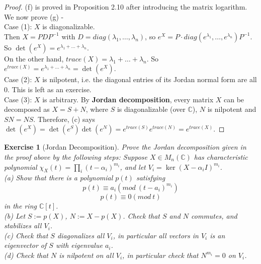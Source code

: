 \documentclass[11pt]{article}
\newtheorem{exercise}[theorem]{Exercise}
\newcommand{\bb}[1]{\mathbb{#1}}
\begin{document}
\begin{proof}
(f) is proved in Proposition 2.10 after introducing the matrix logarithm. We now prove (g) -\\
Case (1): $X$ is diagonalizable.\\
Then $X = PDP^{-1}$ with $D = diag(\lambda_1, \dots, \lambda_n)$, so $e^X = P\cdot diag(e^{\lambda_1}, \dots, e^{\lambda_n}) P^{-1}$. So $\det(e^X) = e^{\lambda_1 + \dots + \lambda_n}$.\\
On the other hand, $trace(X) = \lambda_1 + \dots + \lambda_n$. So $e^{trace(X)} = e^{\lambda_1 + \dots + \lambda_n} = \det(e^X)$.\\
Case (2): $X$ is nilpotent, i.e. the diagonal entries of its Jordan normal form are all $0$. This is left as an exercise.\\
Case (3): $X$ is arbitrary. By \textbf{Jordan decomposition}, every matrix $X$ can be decomposed as $X = S + N$, where $S$ is diagonalizable (over $\bb{C}$), $N$ is nilpotent and $SN = NS$. Therefore, (c) says $\det(e^X) = \det(e^S)\det(e^N) = e^{trace(S)}e^{trace(N)} = e^{trace(X)}$.
\end{proof}

\begin{exercise}[Jordan Decomposition]
Prove the Jordan decomposition given in the proof above by the following steps: Suppose $X \in M_n(\bb{C})$ has characteristic polynomial $\chi_X(t) = \prod_i(t - \alpha_i)^{m_i}$, and let $V_i = \ker (X - \alpha_i I)^{m_i}$.\\
(a) Show that there is a polynomial $p(t)$ satisfying
$$p(t) \equiv a_i (mod\ (t-a_i)^{m_i})$$
$$p(t) \equiv 0 (mod\ t)$$
in the ring $\bb{C}[t]$.\\
(b) Let $S := p(X)$, $N := X - p(X)$. Check that $S$ and $N$ commutes, and stabilizes all $V_i$.\\
(c) Check that $S$ diagonalizes all $V_i$, in particular all vectors in $V_i$ is an eigenvector of $S$ with eigenvalue $a_i$.\\
(d) Check that $N$ is nilpotent on all $V_i$, in particular check that $N^{m_i} = 0$ on $V_i$.
\end{exercise}
\end{document}
